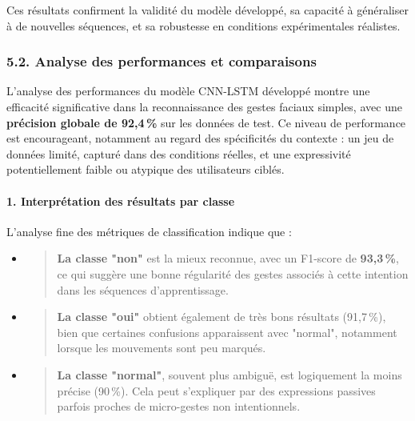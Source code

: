 \documentclass[
]{article}
\begin{document}
Ces résultats confirment la validité du modèle développé, sa capacité à généraliser à de nouvelles séquences, et sa robustesse en conditions expérimentales réalistes.

\hypertarget{analyse-des-performances-et-comparaisons}{%
\subsubsection{5.2. Analyse des performances et comparaisons}\label{analyse-des-performances-et-comparaisons}}

L'analyse des performances du modèle CNN-LSTM développé montre une efficacité significative dans la reconnaissance des gestes faciaux simples, avec une \textbf{précision globale de 92,4\,\%} sur les données de test. Ce niveau de performance est encourageant, notamment au regard des spécificités du contexte : un jeu de données limité, capturé dans des conditions réelles, et une expressivité potentiellement faible ou atypique des utilisateurs ciblés.

\hypertarget{interpruxe9tation-des-ruxe9sultats-par-classe}{%
\paragraph{\texorpdfstring{\textbf{1. Interprétation des résultats par classe}}{1. Interprétation des résultats par classe}}\label{interpruxe9tation-des-ruxe9sultats-par-classe}}

L'analyse fine des métriques de classification indique que :

\begin{itemize}
\item
  \begin{quote}
  \textbf{La classe "non"} est la mieux reconnue, avec un F1-score de \textbf{93,3\,\%}, ce qui suggère une bonne régularité des gestes associés à cette intention dans les séquences d'apprentissage.
  \end{quote}
\item
  \begin{quote}
  \textbf{La classe "oui"} obtient également de très bons résultats (91,7\,\%), bien que certaines confusions apparaissent avec "normal", notamment lorsque les mouvements sont peu marqués.
  \end{quote}
\item
  \begin{quote}
  \textbf{La classe "normal"}, souvent plus ambiguë, est logiquement la moins précise (90\,\%). Cela peut s'expliquer par des expressions passives parfois proches de micro-gestes non intentionnels.
  \end{quote}
\end{itemize}
\end{document}
